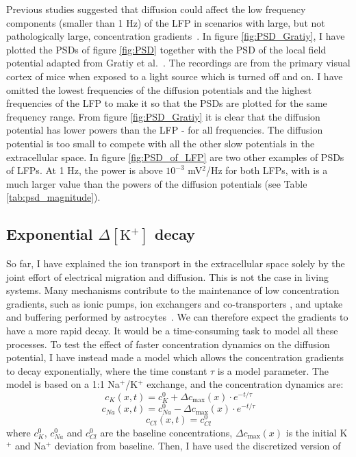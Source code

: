 \documentclass{article}
\begin{document}
Previous studies suggested that diffusion could affect the low frequency components (smaller than 1 Hz) of the LFP in scenarios with large, but not pathologically large, concentration gradients~\cite{Halnes2016}\cite{Gratiy2017}. In figure \ref{fig:PSD_Gratiy}, I have plotted the PSDs of figure \ref{fig:PSD} together with the PSD of the local field potential adapted from Gratiy et al.\ \cite{Gratiy2017}. The recordings are from the primary visual cortex of mice when exposed to a light source which is turned off and on. I have omitted the lowest frequencies of the diffusion potentials and the highest frequencies of the LFP to make it so that the PSDs are plotted for the same frequency range. From figure \ref{fig:PSD_Gratiy} it is clear that the diffusion potential has lower powers than the LFP  - for all frequencies. The diffusion potential is too small to compete with all the other slow potentials in the extracellular space. In figure \ref{fig:PSD_of_LFP} are two other examples of PSDs of LFPs. At 1 Hz, the power is above $10^{-3}$ mV$^2$/Hz for both LFPs, with is a much larger value than the powers of the diffusion potentials (see Table \ref{tab:psd_magnitude}).

\subsection{Exponential $\Delta [\text{K}^+]$ decay}\label{exponential decay}
So far, I have explained the ion transport in the extracellular space solely by the joint effort of electrical migration and diffusion. This is not the case in living systems. Many mechanisms contribute to the maintenance of low concentration gradients, such as ionic pumps, ion exchangers and co-transporters \cite{Neuroscience}, and uptake and buffering performed by astrocytes~\cite{Oschmann2017}. We can therefore expect the gradients to have a more rapid decay. It would be a time-consuming task to model all these processes. To test the effect of faster concentration dynamics on the diffusion potential, I have instead made a model which allows the concentration gradients to decay exponentially, where the time constant $\tau$ is a model parameter. The model is based on a 1:1 Na$^+$/K$^+$ exchange, and the concentration dynamics are:
$$
c_{K}(x,t) = c_{K}^0 +\Delta c_{\text{max}}(x) \cdot e^{-t/\tau}
$$
$$
c_{Na}(x,t) = c_{Na}^0 -\Delta c_{\text{max}}(x) \cdot e^{-t/\tau}
$$
$$
c_{Cl}(x,t) = c_{Cl}^0
$$
where $c_{K}^0$, $c_{Na}^0$ and $c_{Cl}^0$ are the baseline concentrations, $\Delta c_{\text{max}} (x)$ is the initial K$^+$ and Na$^+$ deviation from baseline. Then, I have used the discretized version of
\end{document}
